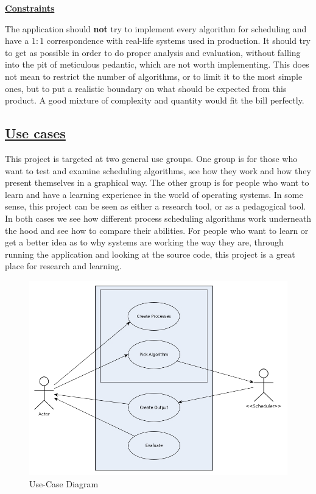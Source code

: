 \documentclass{article}
\begin{document}
\underline{\textbf{Constraints}}

The application should \textbf{not} try to implement every algorithm for scheduling and have a \(1:1\) correspondence with real-life systems used in production. It should try to get as possible in order to do proper analysis and evaluation, without falling into the pit of meticulous pedantic, which are not worth implementing. This does not mean to restrict the number of algorithms, or to limit it to the most simple ones, but to put a realistic boundary on what should be expected from this product. A good mixture of complexity and quantity would fit the bill perfectly.

\subsection{\underline{Use cases}}

This project is targeted at two general use groups. One group is for those who want to test and examine scheduling algorithms, see how they work and how they present themselves in a graphical way. The other group is for people who want to learn and have a learning experience in the world of operating systems. In some sense, this project can be seen as either a research tool, or as a pedagogical tool. In both cases we see how different process scheduling algorithms work underneath the hood and see how to compare their abilities. For people who want to learn or get a better idea as to why systems are working the way they are, through running the application and looking at the source code, this project is a great place for research and learning.

\begin{figure}[H]
  \includegraphics[width=\linewidth]{./pics/usecase.jpg}
  \caption{Use-Case Diagram}
  \label{fig:Use-Case Diagram}
\end{figure}
\end{document}
